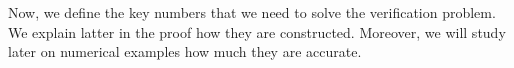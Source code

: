 \documentclass[10pt]{article}
\begin{document}

Now, we define the key numbers that we need to solve the verification problem. We explain latter in the proof how they are constructed. Moreover, we will study later on numerical examples how much they are accurate.  

\begin{comment}
Let $t>0$ and $P\in\lyat{A,Q}$. Let us define the following formula :
\begin{equation}
\label{kappat}
\kappa_t(P)=  \dfrac{\ln\left(\mu_{\xin}(Q)\mu_{\xin}(P)^{-1}t^{-1}\right)}{\ln\left(\norm{A}_P^2\right)}
\end{equation}

Let $P\in\lyap{A}$. We define the following formula :
\begin{equation}
\label{kappainf}
\kappa_\infty(P)= \dfrac{\ln\left(\mu_{\xin}(Q)\mu_{\xin}(P)^{-1}\lambda_d(P)\lambda_1(Q)^{-1}\right)}{\ln\left(\norm{A}_P^2\right)}
\end{equation}
\end{comment}
\end{document}
